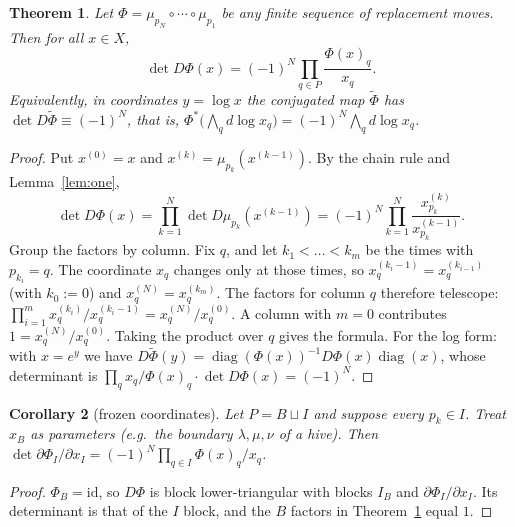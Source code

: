 \documentclass[11pt]{article}
\newtheorem{theorem}{Theorem}
\newtheorem{corollary}[theorem]{Corollary}
\theoremstyle{definition}
\begin{document}
\begin{theorem}\label{thm:main}
Let $\Phi=\mu_{p_N}\circ\cdots\circ\mu_{p_1}$ be any finite sequence of replacement moves. Then for
all $x\in X$,
\[
\det D\Phi(x) = (-1)^N\prod_{q\in P}\frac{\Phi(x)_q}{x_q}.
\]
Equivalently, in coordinates $y=\log x$ the conjugated map $\tilde\Phi$ has $\det D\tilde\Phi\equiv(-1)^N$,
that is, $\Phi^*\bigl(\bigwedge_q d\log x_q\bigr) = (-1)^N\bigwedge_q d\log x_q$.
\end{theorem}
\begin{proof}
Put $x^{(0)}=x$ and $x^{(k)}=\mu_{p_k}(x^{(k-1)})$. By the chain rule and Lemma~\ref{lem:one},
\[
\det D\Phi(x)=\prod_{k=1}^N\det D\mu_{p_k}(x^{(k-1)})=(-1)^N\prod_{k=1}^N\frac{x^{(k)}_{p_k}}{x^{(k-1)}_{p_k}} .
\]
Group the factors by column. Fix $q$, and let $k_1<\dots<k_m$ be the times with $p_{k_i}=q$. The
coordinate $x_q$ changes only at those times, so $x^{(k_i-1)}_q = x^{(k_{i-1})}_q$ (with
$k_0:=0$) and $x^{(N)}_q=x^{(k_m)}_q$. The factors for column $q$ therefore telescope:
$\prod_{i=1}^m x^{(k_i)}_q/x^{(k_i-1)}_q = x^{(N)}_q/x^{(0)}_q$. A column with $m=0$ contributes
$1 = x^{(N)}_q/x^{(0)}_q$. Taking the product over $q$ gives the formula. For the log form: with
$x=e^y$ we have $D\tilde\Phi(y)=\operatorname{diag}(\Phi(x))^{-1}D\Phi(x)\operatorname{diag}(x)$, whose
determinant is $\prod_q x_q/\Phi(x)_q\cdot\det D\Phi(x) = (-1)^N$.
\end{proof}

\begin{corollary}[frozen coordinates]\label{cor:frozen}
Let $P=B\sqcup I$ and suppose every $p_k\in I$. Treat $x_B$ as parameters (e.g.\ the boundary
$\lambda,\mu,\nu$ of a hive). Then $\det\partial\Phi_I/\partial x_I = (-1)^N\prod_{q\in I}\Phi(x)_q/x_q$.
\end{corollary}
\begin{proof}
$\Phi_B=\mathrm{id}$, so $D\Phi$ is block lower-triangular with blocks $I_B$ and
$\partial\Phi_I/\partial x_I$. Its determinant is that of the $I$ block, and the $B$ factors in
Theorem~\ref{thm:main} equal $1$.
\end{proof}
\end{document}
